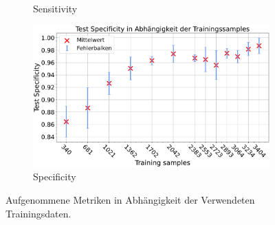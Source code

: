 \begin{figure}[H]
\begin{subfigure}[b]{0.48\textwidth}
    \caption{Sensitivity}
    \label{fig:reduzierung_sensitivity}
  \end{subfigure}
  \begin{subfigure}[b]{0.48\textwidth}
    \includegraphics[width=\textwidth]{plots/2-Messungen-noTu-Tu_Specificity_mean.pdf}
    \caption{Specificity}
    \label{fig:reduzierung_specificity}
  \end{subfigure}
  \caption{Aufgenommene Metriken in Abhängigkeit der Verwendeten Trainingsdaten.}
  \label{fig:reduzierung_trainingsdaten}
\end{figure}

